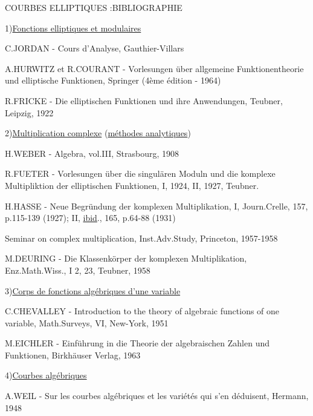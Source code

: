\begin{center}
COURBES ELLIPTIQUES :\quad BIBLIOGRAPHIE
\end{center}

1)\quad \uline{Fonctions elliptiques et modulaires}

C.JORDAN - Cours d'Analyse, Gauthier-Villars

A.HURWITZ et R.COURANT - Vorlesungen über allgemeine Funktionentheorie und elliptische Funktionen, Springer (4ème édition - 1964)

R.FRICKE - Die elliptischen Funktionen und ihre Anwendungen, Teubner, Leipzig, 1922

2)\quad \uline{Multiplication complexe} (\uline{méthodes analytiques})

H.WEBER - Algebra, vol.III, Strasbourg, 1908

R.FUETER - Vorlesungen über die singulären Moduln und die komplexe Multipliktion der elliptischen Funktionen, I, 1924, II, 1927, Teubner.

H.HASSE - Neue Begründung der komplexen Multiplikation, I, Journ.Crelle, 157, p.115-139 (1927); II, \uline{ibid}., 165, p.64-88 (1931)

Seminar on complex multiplication, Inst.Adv.Study, Princeton, 1957-1958

M.DEURING - Die Klassenkörper der komplexen Multiplikation, Enz.Math.Wiss., I 2, 23, Teubner, 1958

3)\quad \uline{Corps de fonctions algébriques d'une variable}

C.CHEVALLEY - Introduction to the theory of algebraic functions of one variable, Math.Surveys, VI, New-York, 1951

M.EICHLER - Einführung in die Theorie der algebraischen Zahlen und Funktionen, Birkhäuser Verlag, 1963
\clearpage
{}
\reversemarginpar
{}
\normalmarginpar
{}

4)\quad \uline{Courbes algébriques}

\reversemarginpar
{}
A.WEIL - Sur \makebox[0pt][l]{\deleted{\unsure{-|=}}}les courbes algébriques et les variétés qui s'en déduisent, Hermann, 1948

